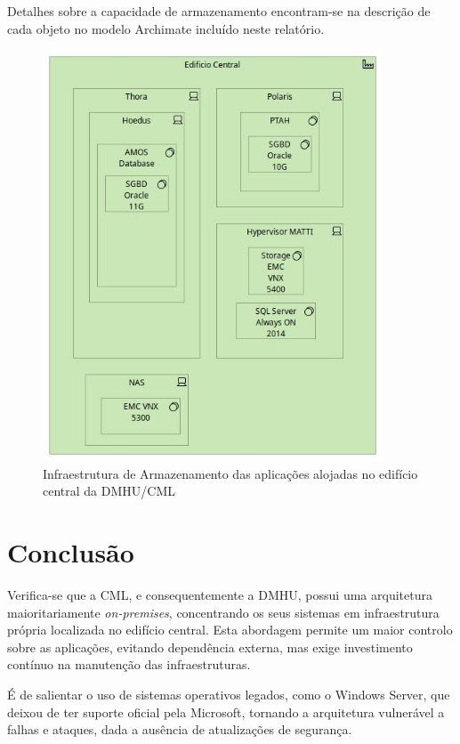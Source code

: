 \documentclass[12pt,a4paper,final]{article}
\begin{document}
    Detalhes sobre a capacidade de armazenamento encontram-se na descrição de cada objeto no modelo Archimate incluído neste relatório.

    \begin{figure}[H]
        \centering
        \includegraphics[width=0.9\textwidth]{Q12 - Storage Infraestructure As-Is}
        \caption{Infraestrutura de Armazenamento das aplicações alojadas no edifício central da DMHU/CML}
        \label{fig:infra_storage}
    \end{figure}

    \section{Conclusão}\label{sec:conclusao}

    Verifica-se que a CML, e consequentemente a DMHU, possui uma arquitetura maioritariamente \textit{on-premises}, concentrando os seus sistemas em infraestrutura própria localizada no edifício central.
    Esta abordagem permite um maior controlo sobre as aplicações, evitando dependência externa, mas exige investimento contínuo na manutenção das infraestruturas.

    É de salientar o uso de sistemas operativos legados, como o Windows Server, que deixou de ter suporte oficial
    pela Microsoft, tornando a arquitetura vulnerável a falhas e ataques, dada a ausência de atualizações de
    segurança. ~\cite{microsoft2023}
\end{document}
